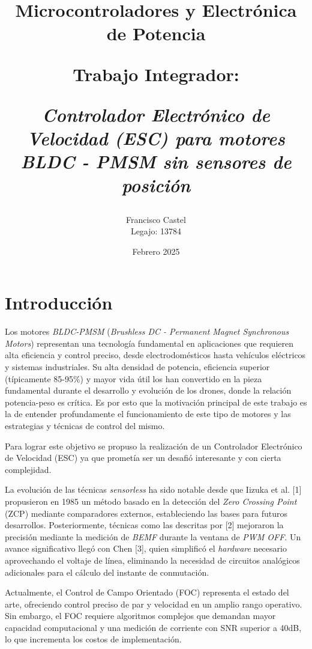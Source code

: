\title{\textbf{Microcontroladores y Electrónica de Potencia}

\vspace{0.5cm}
Trabajo Integrador:
\vspace{0.3cm}

\textit{Controlador Electrónico de Velocidad (ESC) para motores BLDC - PMSM sin sensores de posición}}
\author{Francisco Castel \\ \normalsize{Legajo: 13784}}{}
\date{Febrero 2025}

\maketitle

\section{Introducción}


Los motores \textit{BLDC-PMSM }(\textit{Brushless DC - Permanent Magnet Synchronous Motors}) representan una tecnología fundamental en aplicaciones que requieren alta eficiencia y control preciso, desde electrodomésticos hasta vehículos eléctricos y sistemas industriales. Su alta densidad de potencia, eficiencia superior (típicamente 85-95\%) y mayor vida útil los han convertido en la pieza fundamental durante el desarrollo y evolución de los drones, donde la relación potencia-peso es crítica. Es por esto que la motivación principal de este trabajo es la de entender profundamente el funcionamiento de este tipo de motores y las estrategias y técnicas de control del mismo.

Para lograr este objetivo se propuso la realización de un Controlador Electrónico de Velocidad (ESC) ya que prometía ser un desafió interesante y con cierta complejidad.

La evolución de las técnicas \textit{sensorless} ha sido notable desde que Iizuka et al. [1] propusieron en 1985 un método basado en la detección del \textit{Zero Crossing Point} (ZCP) mediante comparadores externos, estableciendo las bases para futuros desarrollos. Posteriormente, técnicas como las descritas por [2] mejoraron la precisión mediante la medición de \textit{BEMF} durante la ventana de \textit{PWM OFF}. Un avance significativo llegó con Chen [3], quien simplificó el \textit{hardware} necesario aprovechando el voltaje de línea, eliminando la necesidad de circuitos analógicos adicionales para el cálculo del instante de conmutación.

Actualmente, el Control de Campo Orientado (FOC) representa el estado del arte, ofreciendo control preciso de par y velocidad en un amplio rango operativo. Sin embargo, el FOC requiere algoritmos complejos que demandan mayor capacidad computacional y una medición de corriente con SNR superior a 40dB, lo que incrementa los costos de implementación.

